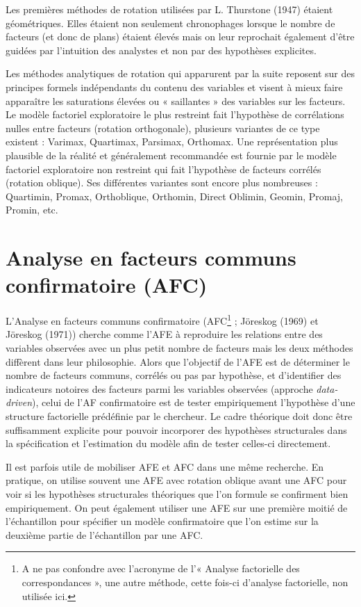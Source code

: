 \documentclass[12pt,a4paper]{reedthesis}
\begin{document}
Les premières méthodes de rotation utilisées par L. Thurstone (1947) étaient géométriques. Elles étaient non seulement chronophages lorsque le nombre de facteurs (et donc de plans) étaient élevés mais on leur reprochait également d'être guidées par l'intuition des analystes et non par des hypothèses explicites.

Les méthodes analytiques de rotation qui apparurent par la suite reposent sur des principes formels indépendants du contenu des variables et visent à mieux faire apparaître les saturations élevées ou « saillantes » des variables sur les facteurs. Le modèle factoriel exploratoire le plus restreint fait l'hypothèse de corrélations nulles entre facteurs (rotation orthogonale), plusieurs variantes de ce type existent : Varimax, Quartimax, Parsimax, Orthomax. Une représentation plus plausible de la réalité et généralement recommandée est fournie par le modèle factoriel exploratoire non restreint qui fait l'hypothèse de facteurs corrélés (rotation oblique). Ses différentes variantes sont encore plus nombreuses : Quartimin, Promax, Orthoblique, Orthomin, Direct Oblimin, Geomin, Promaj, Promin, etc.

\hypertarget{sec:annexeAFAFC}{%
\section{Analyse en facteurs communs confirmatoire (AFC)}\label{sec:annexeAFAFC}}

L'Analyse en facteurs communs confirmatoire (AFC\footnote{A ne pas confondre avec l'acronyme de l'« Analyse factorielle des correspondances », une autre méthode, cette fois-ci d'analyse factorielle, non utilisée ici.} ; Jöreskog (1969) et Jöreskog (1971)) cherche comme l'AFE à reproduire les relations entre des variables observées avec un plus petit nombre de facteurs mais les deux méthodes diffèrent dans leur philosophie. Alors que l'objectif de l'AFE est de déterminer le nombre de facteurs communs, corrélés ou pas par hypothèse, et d'identifier des indicateurs notoires des facteurs parmi les variables observées (approche \emph{data-driven}), celui de l'AF confirmatoire est de tester empiriquement l'hypothèse d'une structure factorielle prédéfinie par le chercheur. Le cadre théorique doit donc être suffisamment explicite pour pouvoir incorporer des hypothèses structurales dans la spécification et l'estimation du modèle afin de tester celles-ci directement.

Il est parfois utile de mobiliser AFE et AFC dans une même recherche. En pratique, on utilise souvent une AFE avec rotation oblique avant une AFC pour voir si les hypothèses structurales théoriques que l'on formule se confirment bien empiriquement. On peut également utiliser une AFE sur une première moitié de l'échantillon pour spécifier un modèle confirmatoire que l'on estime sur la deuxième partie de l'échantillon par une AFC.
\end{document}
